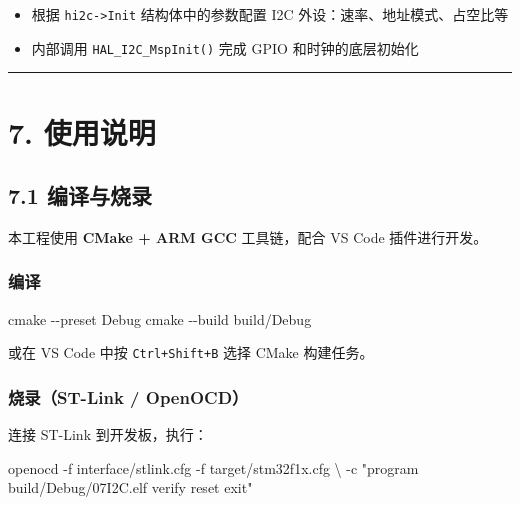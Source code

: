 \documentclass[
  chinese,
  UTF8,
  oneside,
  openany]{ctexbook}
\newenvironment{Shaded}{}{}
\newcommand{\AttributeTok}[1]{\textcolor[rgb]{0.49,0.56,0.16}{#1}}
\newcommand{\DataTypeTok}[1]{\textcolor[rgb]{0.56,0.13,0.00}{#1}}
\newcommand{\ExtensionTok}[1]{#1}
\newcommand{\FunctionTok}[1]{\textcolor[rgb]{0.02,0.16,0.49}{#1}}
\newcommand{\NormalTok}[1]{#1}
\newcommand{\StringTok}[1]{\textcolor[rgb]{0.25,0.44,0.63}{#1}}
\providecommand{\tightlist}{%
  \setlength{\itemsep}{0pt}\setlength{\parskip}{0pt}}
\begin{document}
\begin{itemize}
\tightlist
\item
  根据 \texttt{hi2c-\textgreater{}Init} 结构体中的参数配置 I2C
  外设：速率、地址模式、占空比等
\item
  内部调用 \texttt{HAL\_I2C\_MspInit()} 完成 GPIO 和时钟的底层初始化
\end{itemize}

\begin{center}\rule{0.5\linewidth}{0.5pt}\end{center}

\section{7. 使用说明}\label{ux4f7fux7528ux8bf4ux660e-2}

\subsection{7.1 编译与烧录}\label{ux7f16ux8bd1ux4e0eux70e7ux5f55-2}

本工程使用 \textbf{CMake + ARM GCC} 工具链，配合 VS Code 插件进行开发。

\subsubsection{编译}\label{ux7f16ux8bd1-1}

\begin{Shaded}
\begin{Highlighting}[]
\FunctionTok{cmake} \AttributeTok{{-}{-}preset}\NormalTok{ Debug}
\FunctionTok{cmake} \AttributeTok{{-}{-}build}\NormalTok{ build/Debug}
\end{Highlighting}
\end{Shaded}

或在 VS Code 中按 \texttt{Ctrl+Shift+B} 选择 CMake 构建任务。

\subsubsection{烧录（ST-Link /
OpenOCD）}\label{ux70e7ux5f55st-link-openocd}

连接 ST-Link 到开发板，执行：

\begin{Shaded}
\begin{Highlighting}[]
\ExtensionTok{openocd} \AttributeTok{{-}f}\NormalTok{ interface/stlink.cfg }\AttributeTok{{-}f}\NormalTok{ target/stm32f1x.cfg }\DataTypeTok{\textbackslash{}}
        \AttributeTok{{-}c} \StringTok{"program build/Debug/07I2C.elf verify reset exit"}
\end{Highlighting}
\end{Shaded}
\end{document}
